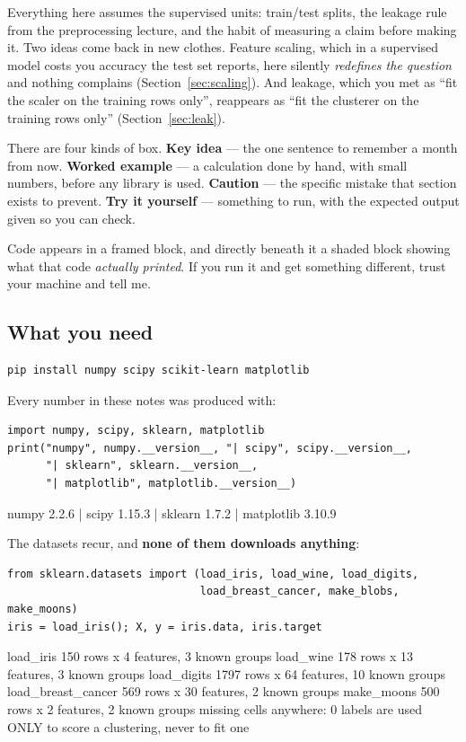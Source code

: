 \documentclass[11pt]{article}
\begin{document}
Everything here assumes the supervised units: train/test splits, the leakage
rule from the preprocessing lecture, and the habit of measuring a claim
before making it. Two ideas come back in new clothes. Feature scaling, which
in a supervised model costs you accuracy the test set reports, here silently
\emph{redefines the question} and nothing complains
(Section~\ref{sec:scaling}). And leakage, which you met as ``fit the scaler
on the training rows only'', reappears as ``fit the clusterer on the training
rows only'' (Section~\ref{sec:leak}).

There are four kinds of box. \textbf{Key idea} --- the one sentence to
remember a month from now. \textbf{Worked example} --- a calculation done by
hand, with small numbers, before any library is used. \textbf{Caution} --- the
specific mistake that section exists to prevent. \textbf{Try it yourself} ---
something to run, with the expected output given so you can check.

Code appears in a framed block, and directly beneath it a shaded block showing
what that code \emph{actually printed}. If you run it and get something
different, trust your machine and tell me.

\subsection{What you need}

\begin{lstlisting}
pip install numpy scipy scikit-learn matplotlib
\end{lstlisting}

Every number in these notes was produced with:

\begin{lstlisting}
import numpy, scipy, sklearn, matplotlib
print("numpy", numpy.__version__, "| scipy", scipy.__version__,
      "| sklearn", sklearn.__version__,
      "| matplotlib", matplotlib.__version__)
\end{lstlisting}
\begin{codeout}
numpy 2.2.6 | scipy 1.15.3 | sklearn 1.7.2 | matplotlib 3.10.9
\end{codeout}

The datasets recur, and \textbf{none of them downloads anything}:

\begin{lstlisting}
from sklearn.datasets import (load_iris, load_wine, load_digits,
                              load_breast_cancer, make_blobs, make_moons)
iris = load_iris(); X, y = iris.data, iris.target
\end{lstlisting}
\begin{codeout}
load_iris            150 rows x  4 features, 3 known groups
load_wine            178 rows x 13 features, 3 known groups
load_digits         1797 rows x 64 features, 10 known groups
load_breast_cancer   569 rows x 30 features, 2 known groups
make_moons           500 rows x  2 features, 2 known groups
missing cells anywhere: 0
labels are used ONLY to score a clustering, never to fit one
\end{codeout}
\end{document}
